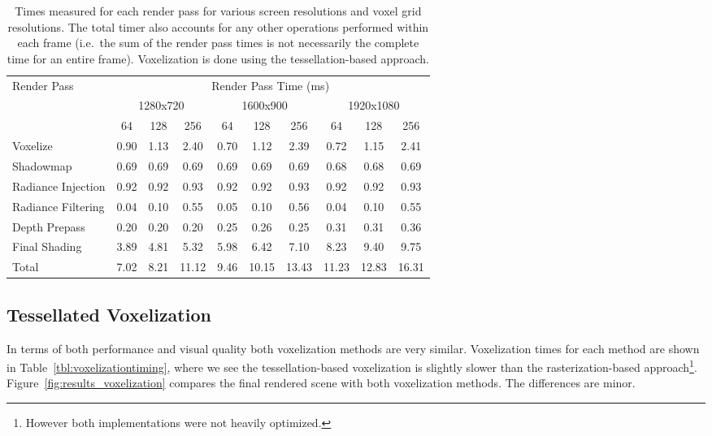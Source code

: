 \begin{table}[H]
\centering
\begin{tabular}{l ccc ccc ccc}
\toprule
Render Pass & \multicolumn{9}{c}{Render Pass Time (ms)} \\
& \multicolumn{3}{c}{1280x720} & \multicolumn{3}{c}{1600x900} & \multicolumn{3}{c}{1920x1080} \\
& 64 & 128 & 256 & 64 & 128 & 256 & 64 & 128 & 256 \\
\midrule
Voxelize           & 0.90 & 1.13 & 2.40  & 0.70 & 1.12 & 2.39  & 0.72 & 1.15 & 2.41\\
Shadowmap          & 0.69 & 0.69 & 0.69  & 0.69 & 0.69 & 0.69  & 0.68 & 0.68 & 0.69\\
Radiance Injection & 0.92 & 0.92 & 0.93  & 0.92 & 0.92 & 0.93  & 0.92 & 0.92 & 0.93\\
Radiance Filtering & 0.04 & 0.10 & 0.55  & 0.05 & 0.10 & 0.56  & 0.04 & 0.10 & 0.55\\
Depth Prepass      & 0.20 & 0.20 & 0.20  & 0.25 & 0.26 & 0.25  & 0.31 & 0.31 & 0.36\\
Final Shading      & 3.89 & 4.81 & 5.32  & 5.98 & 6.42 & 7.10  & 8.23 & 9.40 & 9.75\\
\midrule
Total              & 7.02 & 8.21 & 11.12  & 9.46 & 10.15 & 13.43  & 11.23 & 12.83 & 16.31\\
\bottomrule
\end{tabular}
\caption{Times measured for each render pass for various screen resolutions and voxel grid resolutions. The total timer also accounts for any other operations performed within each frame (i.e.\ the sum of the render pass times is not necessarily the complete time for an entire frame). Voxelization is done using the tessellation-based approach.}
\label{tbl:renderpasstiming}
\end{table}


\subsection{Tessellated Voxelization}
In terms of both performance and visual quality both voxelization methods are very similar. Voxelization times for each method are shown in Table~\ref{tbl:voxelizationtiming}, where we see the tessellation-based voxelization is slightly slower than the rasterization-based approach\footnote{However both implementations were not heavily optimized.}. Figure~\ref{fig:results_voxelization} compares the final rendered scene with both voxelization methods. The differences are minor.

